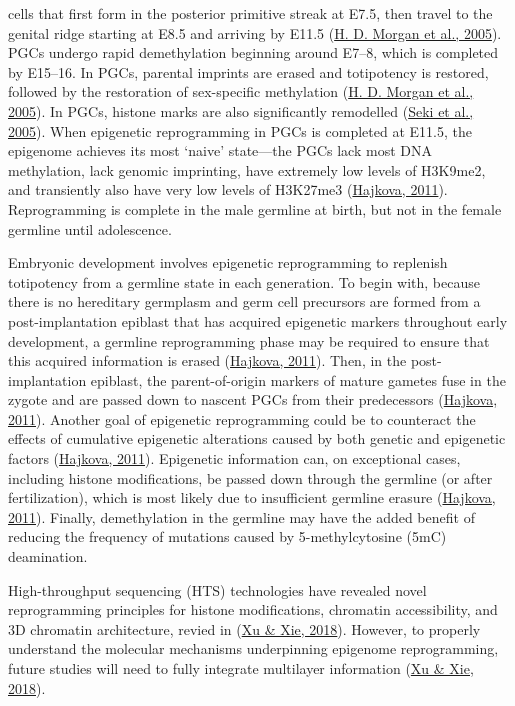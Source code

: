 \documentclass[12pt,twoside]{reedthesis}
\begin{document}
cells that first form in the posterior primitive streak at E7.5, then
travel to the genital ridge starting at E8.5 and arriving by E11.5
(\protect\hyperlink{ref-morgan2005}{H. D. Morgan et al., 2005}). PGCs undergo rapid demethylation beginning around E7--8,
which is completed by E15--16. In PGCs, parental imprints are erased and
totipotency is restored, followed by the restoration of sex-specific
methylation (\protect\hyperlink{ref-morgan2005}{H. D. Morgan et al., 2005}). In PGCs, histone marks are also significantly
remodelled (\protect\hyperlink{ref-seki2005}{Seki et al., 2005}). When epigenetic reprogramming in PGCs is
completed at E11.5, the epigenome achieves its most `naive' state---the
PGCs lack most DNA methylation, lack genomic imprinting, have extremely
low levels of H3K9me2, and transiently also have very low levels of
H3K27me3 (\protect\hyperlink{ref-hajkova2011}{Hajkova, 2011}). Reprogramming is complete in the male germline
at birth, but not in the female germline until adolescence.

Embryonic development involves epigenetic reprogramming to replenish
totipotency from a germline state in each generation. To begin with,
because there is no hereditary germplasm and germ cell precursors are
formed from a post-implantation epiblast that has acquired epigenetic
markers throughout early development, a germline reprogramming phase may
be required to ensure that this acquired information is erased
(\protect\hyperlink{ref-hajkova2011}{Hajkova, 2011}). Then, in the post-implantation epiblast, the
parent-of-origin markers of mature gametes fuse in the zygote and are
passed down to nascent PGCs from their predecessors (\protect\hyperlink{ref-hajkova2011}{Hajkova, 2011}).
Another goal of epigenetic reprogramming could be to counteract the
effects of cumulative epigenetic alterations caused by both genetic and
epigenetic factors (\protect\hyperlink{ref-hajkova2011}{Hajkova, 2011}). Epigenetic information can, on
exceptional cases, including histone modifications, be passed down
through the germline (or after fertilization), which is most likely due
to insufficient germline erasure (\protect\hyperlink{ref-hajkova2011}{Hajkova, 2011}). Finally, demethylation
in the germline may have the added benefit of reducing the frequency of
mutations caused by 5-methylcytosine (5mC) deamination.

High-throughput sequencing (HTS) technologies have revealed novel
reprogramming principles for histone modifications, chromatin
accessibility, and 3D chromatin architecture, revied in (\protect\hyperlink{ref-xu2018}{Xu \& Xie, 2018}).
However, to properly understand the molecular mechanisms underpinning
epigenome reprogramming, future studies will need to fully integrate
multilayer information (\protect\hyperlink{ref-xu2018}{Xu \& Xie, 2018}).
\end{document}
